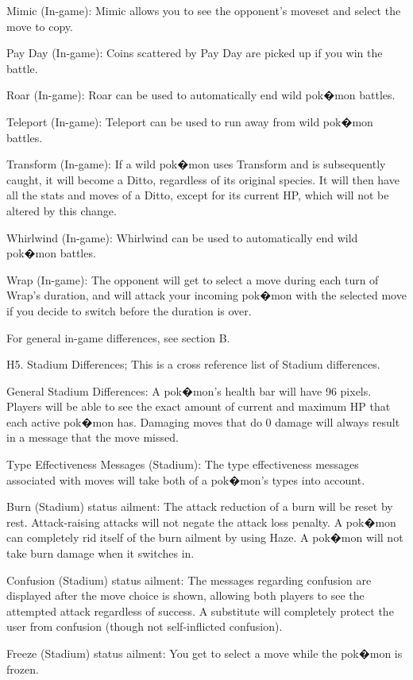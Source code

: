 \documentclass[reprint, aps, prl, paper=A4]{revtex4-1}
\begin{document}
Mimic (In-game):
Mimic allows you to see the opponent's moveset and select the move to copy.

Pay Day (In-game):
Coins scattered by Pay Day are picked up if you win the battle.

Roar (In-game):
Roar can be used to automatically end wild pok�mon battles.

Teleport (In-game):
Teleport can be used to run away from wild pok�mon battles.

Transform (In-game):
If a wild pok�mon uses Transform and is subsequently caught, it will become a Ditto, regardless
of its original species. It will then have all the stats and moves of a Ditto, except for its
current HP, which will not be altered by this change.

Whirlwind (In-game):
Whirlwind can be used to automatically end wild pok�mon battles.

Wrap (In-game):
The opponent will get to select a move during each turn of Wrap's duration, and will attack
your incoming pok�mon with the selected move if you decide to switch before the duration is
over.

For general in-game differences, see section B.


H5. Stadium Differences;
This is a cross reference list of Stadium differences.

General Stadium Differences:
A pok�mon's health bar will have 96 pixels. Players will be able to see the exact amount of
current and maximum HP that each active pok�mon has. Damaging moves that do 0 damage will
always result in a message that the move missed.

Type Effectiveness Messages (Stadium):
The type effectiveness messages associated with moves will take both of a pok�mon's types into
account.

Burn (Stadium) status ailment:
The attack reduction of a burn will be reset by rest. Attack-raising attacks will not negate
the attack loss penalty. A pok�mon can completely rid itself of the burn ailment by using Haze.
A pok�mon will not take burn damage when it switches in.

Confusion (Stadium) status ailment:
The messages regarding confusion are displayed after the move choice is shown, allowing both
players to see the attempted attack regardless of success. A substitute will completely protect
the user from confusion (though not self-inflicted confusion).

Freeze (Stadium) status ailment:
You get to select a move while the pok�mon is frozen.
\end{document}
